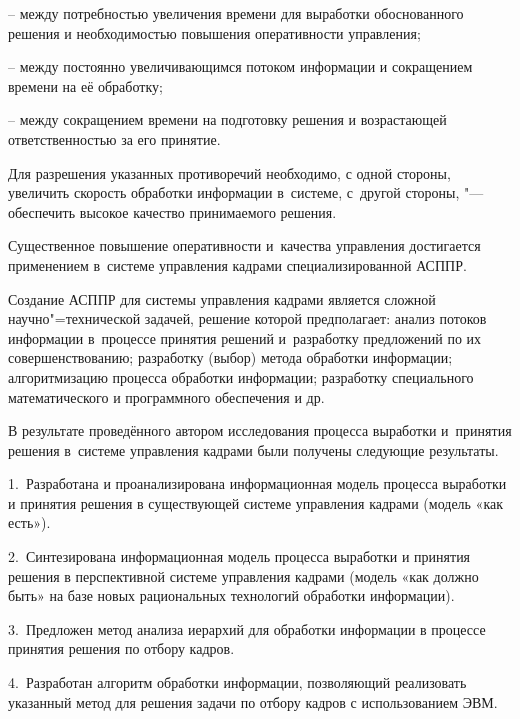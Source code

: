 -- между потребностью увеличения времени для выработки обоснованного решения и необходимостью повышения оперативности управления;



-- между постоянно увеличивающимся потоком информации и сокращением времени на её обработку;



-- между сокращением времени на подготовку решения и возрастающей ответственностью за его принятие.



Для разрешения указанных противоречий необходимо, с одной стороны, увеличить скорость обработки информации в~системе, с~другой стороны, "--- обеспечить высокое качество принимаемого решения.



Существенное повышение оперативности и~качества управления достигается применением в~системе управления кадрами специализированной АСППР.



Создание АСППР для системы управления кадрами является сложной научно"=технической задачей, решение которой предполагает: анализ потоков информации в~процессе принятия решений и~разработку предложений по их совершенствованию; разработку (выбор) метода обработки информации; алгоритмизацию процесса обработки информации; разработку специального математического и программного обеспечения и др.



В результате проведённого автором исследования процесса выработки и~принятия решения в~системе управления кадрами были получены следующие результаты.



1. Разработана и проанализирована информационная модель процесса выработки и принятия решения в существующей системе управления кадрами (модель «как есть»).



2. Синтезирована информационная модель процесса выработки и принятия решения в перспективной системе управления кадрами (модель «как должно быть» на базе новых рациональных технологий обработки информации).



3. Предложен метод анализа иерархий для обработки информации в процессе принятия решения по отбору кадров.



4. Разработан алгоритм обработки информации, позволяющий реализовать указанный метод для решения задачи по отбору кадров с использованием ЭВМ.




